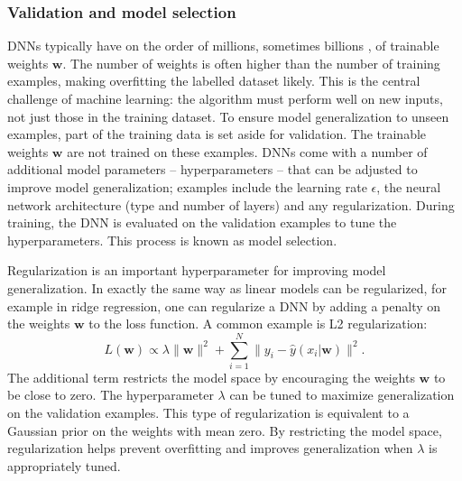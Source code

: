 \subsubsection{Validation and model selection}
\label{sec:val}
DNNs typically have on the order of millions, sometimes billions \citep{brown_language_2020}, of trainable weights $\mathbf{w}$. The number of weights is often higher than the number of training examples, making overfitting the labelled dataset likely. This is the central challenge of machine learning: the algorithm must perform well on new inputs, not just those in the training dataset. To ensure model generalization to unseen examples, part of the training data is set aside for validation. 
The trainable weights $\mathbf{w}$ are not trained on these examples.
DNNs come with a number of additional model parameters -- hyperparameters -- that can be adjusted to improve model generalization; examples include the learning rate $\epsilon$, the neural network architecture (type and number of layers) and any regularization. During training, the DNN is evaluated on the validation examples to tune the hyperparameters. This process is known as model selection. %

Regularization is an important hyperparameter for improving model generalization. In exactly the same way as linear models can be regularized, for example in ridge regression, one can regularize a DNN by adding a penalty on the weights $\mathbf{w}$ to the loss function. A common example is L2 regularization:  
\begin{equation}
    L(\mathbf{w}) \propto \lambda\|\mathbf{w}\|^2 + \sum^N_{i=1}\|y_i - \hat{y}(x_i|\mathbf{w})\|^2.
    \label{eqn:regloss}
\end{equation}
The additional term restricts the model space by encouraging the weights $\mathbf{w}$ to be close to zero. The hyperparameter $\lambda$ can be tuned to maximize generalization on the validation examples. This type of regularization is equivalent to a Gaussian prior on the weights with mean zero. By restricting the model space, regularization helps prevent overfitting and improves generalization when $\lambda$ is appropriately tuned.

